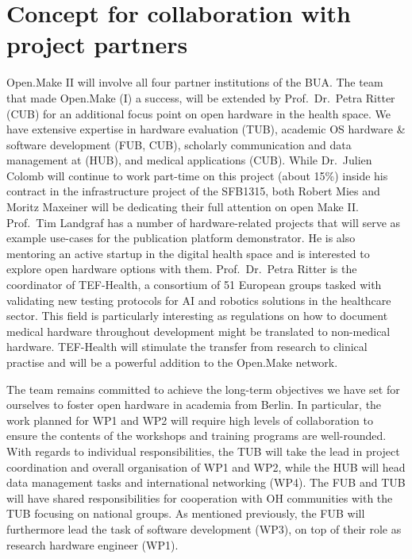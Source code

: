 \documentclass[
  12pt,
  a4paper,
]{article}
\begin{document}
\hypertarget{concept-for-collaboration-with-project-partners}{%
\section{Concept for collaboration with project
partners}\label{concept-for-collaboration-with-project-partners}}

Open.Make II will involve all four partner institutions of the BUA. The
team that made Open.Make (I) a success, will be extended by
Prof.~Dr.~Petra Ritter (CUB) for an additional focus point on open
hardware in the health space. We have extensive expertise in hardware
evaluation (TUB), academic OS hardware \& software development (FUB,
CUB), scholarly communication and data management at (HUB), and medical
applications (CUB). While Dr.~Julien Colomb will continue to work
part-time on this project (about 15\%) inside his contract in the
infrastructure project of the SFB1315, both Robert Mies and Moritz
Maxeiner will be dedicating their full attention on open Make II.
Prof.~Tim Landgraf has a number of hardware-related projects that will
serve as example use-cases for the publication platform demonstrator. He
is also mentoring an active startup in the digital health space and is
interested to explore open hardware options with them. Prof.~Dr.~Petra
Ritter is the coordinator of TEF-Health, a consortium of 51 European
groups tasked with validating new testing protocols for AI and robotics
solutions in the healthcare sector. This field is particularly
interesting as regulations on how to document medical hardware
throughout development might be translated to non-medical hardware.
TEF-Health will stimulate the transfer from research to clinical
practise and will be a powerful addition to the Open.Make network.

The team remains committed to achieve the long-term objectives we have
set for ourselves to foster open hardware in academia from Berlin. In
particular, the work planned for WP1 and WP2 will require high levels of
collaboration to ensure the contents of the workshops and training
programs are well-rounded. With regards to individual responsibilities,
the TUB will take the lead in project coordination and overall
organisation of WP1 and WP2, while the HUB will head data management
tasks and international networking (WP4). The FUB and TUB will have
shared responsibilities for cooperation with OH communities with the TUB
focusing on national groups. As mentioned previously, the FUB will
furthermore lead the task of software development (WP3), on top of their
role as research hardware engineer (WP1).
\end{document}
